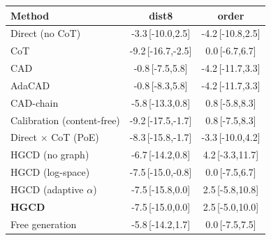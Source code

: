 \begin{tabular}{lcc}
\toprule
Method & dist8 & order \\
\midrule
Direct (no CoT) & -3.3\,{\scriptsize[-10.0,2.5]} & -4.2\,{\scriptsize[-10.8,2.5]} \\
CoT & -9.2\,{\scriptsize[-16.7,-2.5]} & 0.0\,{\scriptsize[-6.7,6.7]} \\
CAD & -0.8\,{\scriptsize[-7.5,5.8]} & -4.2\,{\scriptsize[-11.7,3.3]} \\
AdaCAD & -0.8\,{\scriptsize[-8.3,5.8]} & -4.2\,{\scriptsize[-11.7,3.3]} \\
CAD-chain & -5.8\,{\scriptsize[-13.3,0.8]} & 0.8\,{\scriptsize[-5.8,8.3]} \\
Calibration (content-free) & -9.2\,{\scriptsize[-17.5,-1.7]} & 0.8\,{\scriptsize[-7.5,8.3]} \\
Direct $\times$ CoT (PoE) & -8.3\,{\scriptsize[-15.8,-1.7]} & -3.3\,{\scriptsize[-10.0,4.2]} \\
HGCD (no graph) & -6.7\,{\scriptsize[-14.2,0.8]} & 4.2\,{\scriptsize[-3.3,11.7]} \\
HGCD (log-space) & -7.5\,{\scriptsize[-15.0,-0.8]} & 0.0\,{\scriptsize[-7.5,6.7]} \\
HGCD (adaptive $\alpha$) & -7.5\,{\scriptsize[-15.8,0.0]} & 2.5\,{\scriptsize[-5.8,10.8]} \\
\textbf{HGCD} & -7.5\,{\scriptsize[-15.0,0.0]} & 2.5\,{\scriptsize[-5.0,10.0]} \\
Free generation & -5.8\,{\scriptsize[-14.2,1.7]} & 0.0\,{\scriptsize[-7.5,7.5]} \\
\bottomrule
\end{tabular}
